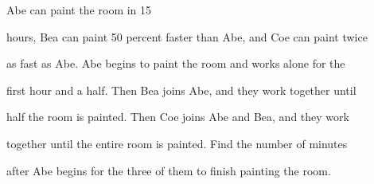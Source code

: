 Abe can paint the room in 15 

hours, Bea can paint 50 percent faster than Abe, and Coe can paint twice

 as fast as Abe. Abe begins to paint the room and works alone for the 

first hour and a half. Then Bea joins Abe, and they work together until 

half the room is painted. Then Coe joins Abe and Bea, and they work 

together until the entire room is painted. Find the number of minutes 

after Abe begins for the three of them to finish painting the room.